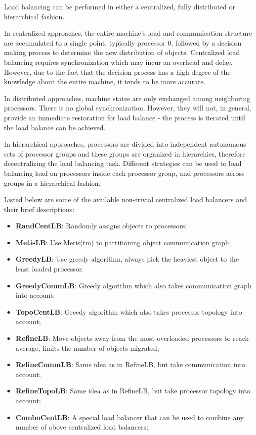 \label{lbStrategy}

Load balancing can be performed in either a centralized, fully distributed
or hierarchical fashion.

In centralized approaches, the entire machine's load and communication
structure are accumulated to a single point, typically processor 0, followed by
a decision making process to determine the new distribution of \charmpp
objects. Centralized load balancing requires synchronization which may incur an
overhead and delay. However, due to the fact that the decision process has a
high degree of the knowledge about the entire machine, it tends to be more
accurate.

In distributed approaches, machine states are only exchanged among 
neighboring processors. There is no global synchronization. However,
they will not, in general, provide an immediate restoration for load balance -
the process is iterated until the load balance can be achieved.

In hierarchical approaches, processors are divided into independent autonomous
sets of processor groups and these groups are organized in hierarchies,
therefore decentralizing the load balancing task. Different strategies can be
used to load balancing load on processors inside each processor group, and
processors across groups in a hierarchical fashion.

Listed below are some of the available non-trivial centralized load balancers
and their brief descriptions:
\begin{itemize}
\item {\bf RandCentLB}:   Randomly assigns objects to processors;
\item {\bf MetisLB}:      Use Metis(tm) to partitioning object communication graph;
\item {\bf GreedyLB}:   Use greedy algorithm, always pick the heaviest object to the least loaded processor.
\item {\bf GreedyCommLB}:       Greedy algorithm which also takes communication graph into account;
\item {\bf TopoCentLB}:       Greedy algorithm which also takes processor topology into account;
\item {\bf RefineLB}:     Move objects away from the most overloaded processors to reach average, limits the number of objects migrated;
\item {\bf RefineCommLB}:     Same idea as in RefineLB, but take communication into account;
\item {\bf RefineTopoLB}:       Same idea as in RefineLB, but take processor topology into account;
\item {\bf ComboCentLB}:  A special load balancer that can be used to combine any number of above centralized load balancers;
\end{itemize}

